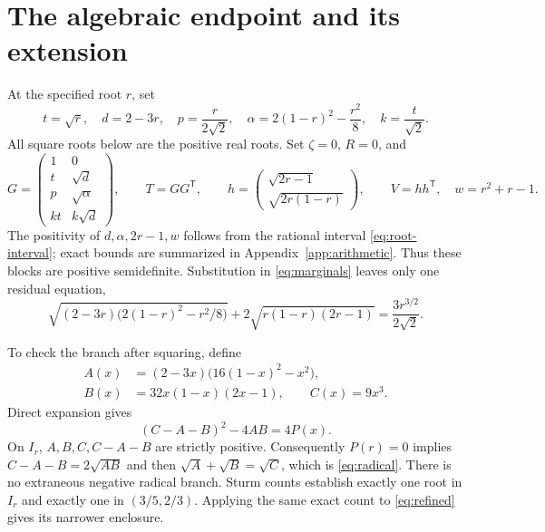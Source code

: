 \documentclass[11pt]{article}
\begin{document}
\section{The algebraic endpoint and its extension}\label{sec:primal}
At the specified root $r$, set
\begin{equation}\label{eq:primal-parameters}
t=\sqrt r,\quad d=2-3r,\quad p=\frac{r}{2\sqrt2},\quad
\alpha=2(1-r)^2-\frac{r^2}{8},\quad k=\frac{t}{\sqrt2}.
\end{equation}
All square roots below are the positive real roots. Set $\zeta=0$, $R=0$,
and
\begin{equation}\label{eq:primal}
G=\begin{pmatrix}
1&0\\ t&\sqrt d\\ p&\sqrt\alpha\\ kt&k\sqrt d
\end{pmatrix},\qquad
T=GG^{\mathsf T},\qquad
h=\begin{pmatrix}\sqrt{2r-1}\\\sqrt{2r(1-r)}\end{pmatrix},\qquad
V=hh^{\mathsf T},\quad w=r^2+r-1.
\end{equation}
The positivity of $d,\alpha,2r-1,w$ follows from the rational interval
\eqref{eq:root-interval}; exact bounds are summarized in Appendix~\ref{app:arithmetic}.
Thus these blocks are positive semidefinite. Substitution in
\eqref{eq:marginals} leaves only one residual equation,
\begin{equation}\label{eq:radical}
\sqrt{(2-3r)\bigl(2(1-r)^2-r^2/8\bigr)}
+2\sqrt{r(1-r)(2r-1)}=\frac{3r^{3/2}}{2\sqrt2}.
\end{equation}

To check the branch after squaring, define
\begin{equation}\label{eq:ABC}
\begin{split}
A(x)&=(2-3x)\bigl(16(1-x)^2-x^2\bigr),\\
B(x)&=32x(1-x)(2x-1),\qquad C(x)=9x^3.
\end{split}
\end{equation}
Direct expansion gives
\begin{equation}\label{eq:squaring}
(C-A-B)^2-4AB=4P(x).
\end{equation}
On $I_r$, $A,B,C,C-A-B$ are strictly positive. Consequently $P(r)=0$
implies $C-A-B=2\sqrt{AB}$ and then
$\sqrt A+\sqrt B=\sqrt C$, which is \eqref{eq:radical}.
There is no extraneous negative radical branch. Sturm counts establish
exactly one root in $I_r$ and exactly one in $(3/5,2/3)$.
Applying the same exact count to \eqref{eq:refined} gives its narrower
enclosure.
\end{document}
